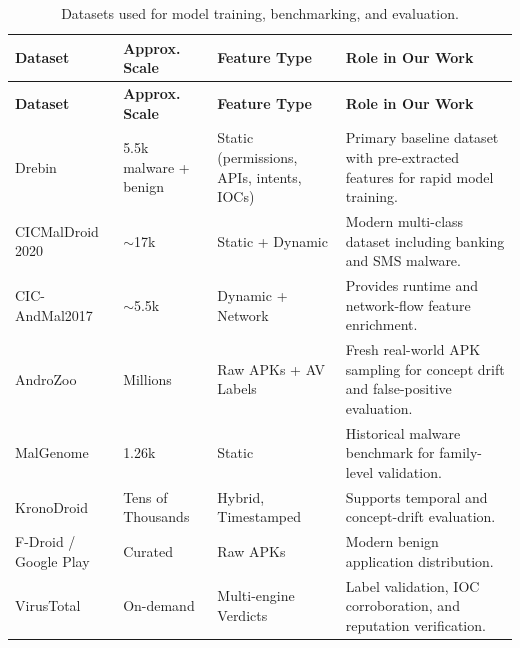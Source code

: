 \documentclass[11pt,a4paper]{article}
\begin{document}
\begin{longtable}{|p{2.8cm}|p{2.0cm}|p{3.0cm}|p{5.5cm}|}
\caption{Datasets used for model training, benchmarking, and evaluation.} \\
\hline
\rowcolor{blue!25}
\textbf{Dataset} &
\textbf{Approx. Scale} &
\textbf{Feature Type} &
\textbf{Role in Our Work} \\
\hline
\endfirsthead

\hline
\rowcolor{blue!25}
\textbf{Dataset} &
\textbf{Approx. Scale} &
\textbf{Feature Type} &
\textbf{Role in Our Work} \\
\hline
\endhead

Drebin &
5.5k malware + benign &
Static (permissions, APIs, intents, IOCs) &
Primary baseline dataset with pre-extracted features for rapid model training.
\\ \hline

CICMalDroid 2020 &
$\sim$17k &
Static + Dynamic &
Modern multi-class dataset including banking and SMS malware.
\\ \hline

CIC-AndMal2017 &
$\sim$5.5k &
Dynamic + Network &
Provides runtime and network-flow feature enrichment.
\\ \hline

AndroZoo &
Millions &
Raw APKs + AV Labels &
Fresh real-world APK sampling for concept drift and false-positive evaluation.
\\ \hline

MalGenome &
1.26k &
Static &
Historical malware benchmark for family-level validation.
\\ \hline

KronoDroid &
Tens of Thousands &
Hybrid, Timestamped &
Supports temporal and concept-drift evaluation.
\\ \hline

F-Droid / Google Play &
Curated &
Raw APKs &
Modern benign application distribution.
\\ \hline

VirusTotal &
On-demand &
Multi-engine Verdicts &
Label validation, IOC corroboration, and reputation verification.
\\ \hline

\end{longtable}
\end{document}
